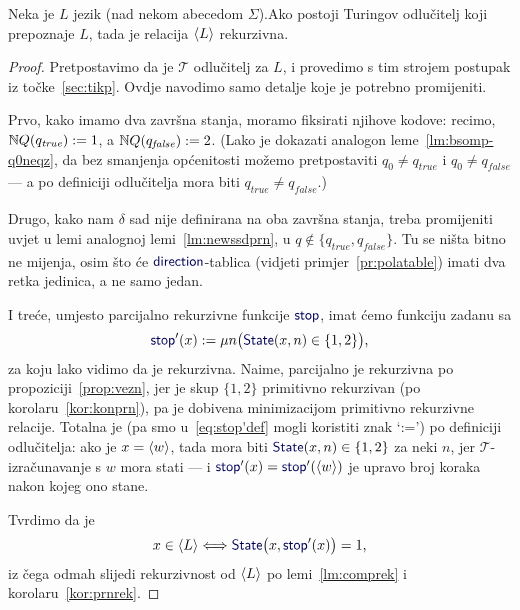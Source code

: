 \begin{teorem}[{name=[rekurzivnost Turing-odlučivog jezika]}]\label{tm:oikr}
    Neka je $L$ jezik (nad nekom abecedom $\Sigma$).\newline Ako postoji Turingov odlučitelj koji prepoznaje $L$, tada je relacija $\langle L\rangle$ rekurzivna.
\end{teorem}
\begin{proof}
Pretpostavimo da je $\mathcal T$ odlučitelj za $L$, i provedimo s tim strojem postupak iz točke~\ref{sec:tikp}. Ovdje navodimo samo detalje koje je potrebno promijeniti.

Prvo, kako imamo dva završna stanja, moramo fiksirati njihove kodove: recimo, ${\mathbb N} Q(q_\mathit{true}):=1$, a ${\mathbb N} Q(q_\mathit{false}):=2$. (Lako je dokazati analogon leme~\ref{lm:bsomp-q0neqz}, da bez smanjenja općenitosti možemo pretpostaviti $q_0\ne q_\mathit{true}$ i $q_0\ne q_\mathit{false}$ --- a po definiciji odlučitelja mora biti $q_\mathit{true}\ne q_\mathit{false}$.)

    Drugo, kako nam $\delta$ sad nije definirana na oba završna stanja, treba promijeniti uvjet u lemi analognoj lemi~\ref{lm:newssdprn}, u $q\notin\{q_\mathit{true},q_\mathit{false}\}$. Tu se ništa bitno ne mijenja, osim što će $\f{direction}$-tablica (vidjeti primjer~\ref{pr:polatable}) imati dva retka jedinica, a ne samo jedan.

I treće, umjesto parcijalno rekurzivne funkcije $\f{stop}$, imat ćemo funkciju zadanu sa
\begin{equation}\label{eq:stop'def}
    \f{stop}'(x):=\mu n\bigl(\f{State}(x,n)\in\{1,2\}\bigr)\text,
\end{equation}
    za koju lako vidimo da je rekurzivna. Naime, parcijalno je rekurzivna po propoziciji~\ref{prop:vezn}, jer je skup $\{1,2\}$ primitivno rekurzivan (po korolaru~\ref{kor:konprn}), pa je dobivena minimizacijom primitivno rekurzivne relacije. Totalna je (pa smo u~\eqref{eq:stop'def} mogli koristiti znak \enquote*{:=}) po definiciji odlučitelja: ako je $x=\langle w\rangle$, tada mora biti $\f{State}(x,n)\in\{1,2\}$ za neki $n$, jer $\mathcal T$-izračunavanje s $w$ mora stati --- i $\f{stop}'(x)=\f{stop}'(\kr w)$ je upravo broj koraka nakon kojeg ono stane.

Tvrdimo da je
\begin{equation}
    x\in\kr L\Longleftrightarrow\f{State}\bigl(x,\f{stop}'(x)\bigr)=1\text,
\end{equation}
iz čega odmah slijedi rekurzivnost od $\langle L\rangle$ po lemi~\ref{lm:comprek} i korolaru~\ref{kor:prnrek}. 


\end{proof}
